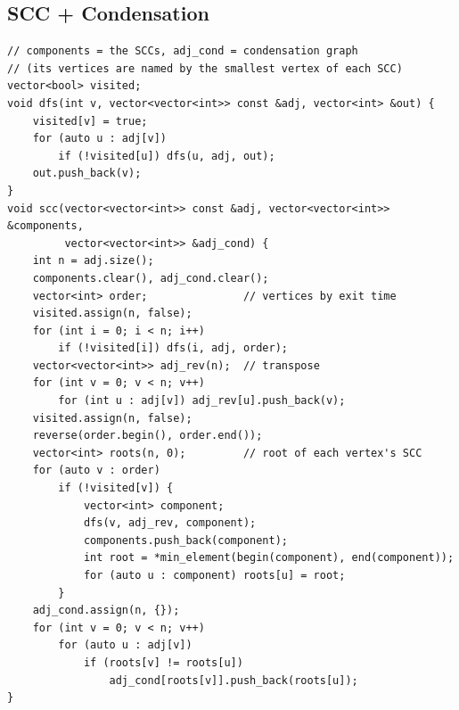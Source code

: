 \subsection{SCC + Condensation}
\begin{lstlisting}
// components = the SCCs, adj_cond = condensation graph
// (its vertices are named by the smallest vertex of each SCC)
vector<bool> visited;
void dfs(int v, vector<vector<int>> const &adj, vector<int> &out) {
    visited[v] = true;
    for (auto u : adj[v])
        if (!visited[u]) dfs(u, adj, out);
    out.push_back(v);
}
void scc(vector<vector<int>> const &adj, vector<vector<int>> &components,
         vector<vector<int>> &adj_cond) {
    int n = adj.size();
    components.clear(), adj_cond.clear();
    vector<int> order;               // vertices by exit time
    visited.assign(n, false);
    for (int i = 0; i < n; i++)
        if (!visited[i]) dfs(i, adj, order);
    vector<vector<int>> adj_rev(n);  // transpose
    for (int v = 0; v < n; v++)
        for (int u : adj[v]) adj_rev[u].push_back(v);
    visited.assign(n, false);
    reverse(order.begin(), order.end());
    vector<int> roots(n, 0);         // root of each vertex's SCC
    for (auto v : order)
        if (!visited[v]) {
            vector<int> component;
            dfs(v, adj_rev, component);
            components.push_back(component);
            int root = *min_element(begin(component), end(component));
            for (auto u : component) roots[u] = root;
        }
    adj_cond.assign(n, {});
    for (int v = 0; v < n; v++)
        for (auto u : adj[v])
            if (roots[v] != roots[u])
                adj_cond[roots[v]].push_back(roots[u]);
}
\end{lstlisting}
